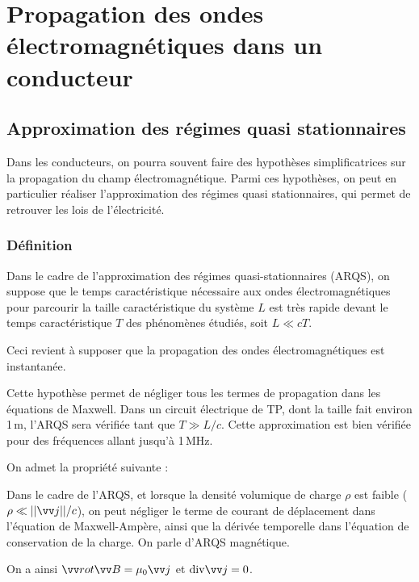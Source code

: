 \documentclass[11pt,fleqn]{book} %
\newcommand{\div}{\mathrm{div}}
\begin{document}
\section{Propagation des ondes électromagnétiques dans un conducteur}

\subsection{Approximation des régimes quasi stationnaires}

Dans les conducteurs, on pourra souvent faire des hypothèses simplificatrices sur la propagation du champ électromagnétique. Parmi ces hypothèses, on peut en particulier réaliser l'approximation des régimes quasi stationnaires, qui permet de retrouver les lois de l'électricité.

\subsubsection{Définition}

\begin{definition}
	Dans le cadre de l’approximation des régimes quasi-stationnaires (ARQS), on suppose que le temps caractéristique nécessaire aux ondes électromagnétiques pour parcourir la taille caractéristique du système $L$ est très rapide devant le temps caractéristique $T$ des phénomènes étudiés, soit $L \ll cT$.

	Ceci revient à supposer que la propagation des ondes électromagnétiques est instantanée.
\end{definition}

Cette hypothèse permet de négliger tous les termes de propagation dans les équations de Maxwell. Dans un circuit électrique de TP, dont la taille fait environ 1\,m, l'ARQS sera vérifiée tant que $T \gg L/c$. Cette approximation est bien vérifiée pour des fréquences allant jusqu'à 1\,MHz.

On admet la propriété suivante :
\begin{proposition}
	Dans le cadre de l'ARQS, et lorsque la densité volumique de charge $\rho$ est faible ($\rho \ll ||\vv j||/c$), on peut négliger le terme de courant de déplacement dans l'équation de Maxwell-Ampère, ainsi que la dérivée temporelle dans l'équation de conservation de la charge. On parle d'ARQS magnétique.

	On a ainsi $\vv rot \vv B = \mu_0 \vv j$ et $\div \vv j = 0$.
\end{proposition}
\end{document}
